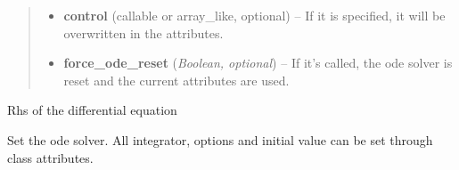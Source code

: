 \documentclass[letterpaper,10pt,english]{sphinxmanual}
\begin{document}
\begin{fulllineitems}
\begin{fulllineitems}
\begin{quote}
\begin{description}
\begin{itemize}
\item {} 
\textbf{control} (callable  or array\_like, optional) -- If it is specified, it will be overwritten in the attributes.

\item {} 
\textbf{force\_ode\_reset} (\emph{Boolean, optional}) -- If it's called, the ode solver is reset and the current attributes
are used.

\end{itemize}

\end{description}\end{quote}

\end{fulllineitems}


\begin{fulllineitems}
\label{pod:pod.lss.f}
Rhs of the differential equation

\end{fulllineitems}


\begin{fulllineitems}
\end{fulllineitems}


\begin{fulllineitems}
\end{fulllineitems}


\begin{fulllineitems}
\end{fulllineitems}


\begin{fulllineitems}
\label{pod:pod.lss.setupODE}
Set the ode solver. All integrator, options and initial value can
be set through class attributes.

\end{fulllineitems}


\end{fulllineitems}
\end{document}
